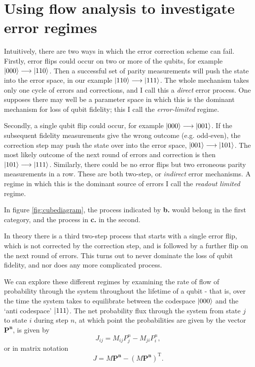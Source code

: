 \documentclass{report}
\begin{document}
\section{Using flow analysis to investigate error regimes}
Intuitively, there are two ways in which the error correction scheme can fail. Firstly, error flips could occur on two or more of the qubits, for example $\ket{000} \longrightarrow \ket{110}$. Then a successful set of parity measurements will push the state into the error space, in our example $\ket{110} \longrightarrow \ket{111}$. The whole mechanism takes only one cycle of errors and corrections, and I call this a \textit{direct} error process. One supposes there may well be a parameter space in which this is the dominant mechanism for loss of qubit fidelity; this I call the \textit{error-limited} regime.

Secondly, a single qubit flip could occur, for example $\ket{000} \longrightarrow \ket{001}$. If the subsequent fidelity measurements give the wrong outcome (e.g. odd-even), the correction step may push the state over into the error space, $\ket{001} \longrightarrow \ket{101}$. The most likely outcome of the next round of errors and correction is then $\ket{101} \longrightarrow \ket{111}$. Similarly, there could be no error flips but two erroneous parity measurements in a row. These are both two-step, or \textit{indirect} error mechanisms. A regime in which this is the dominant source of errors I call the \textit{readout limited} regime.

In figure \ref{fig:cubediagram}, the process indicated by \textbf{b.} would belong in the first category, and the process in \textbf{c.} in the second.

In theory there is a third two-step process that starts with a single error flip, which is not corrected by the correction step, and is followed by a further flip on the next round of errors. This turns out to never dominate the loss of qubit fidelity, and nor does any more complicated process.

We can explore these different regimes by examining the rate of flow of probability through the system throughout the lifetime of a qubit - that is, over the time the system takes to equilibrate between the codespace $\ket{000}$ and the `anti codespace' $\ket{111}$. The net probability flux through the system from state $j$ to state $i$ during step $n$, at which point the probabilities are given by the vector $\mathbf{P^n}$, is given by
\begin{equation*}
    J_{ij} = M_{ij}P^n_j - M_{ji} P^n_i,
\end{equation*}
or in matrix notation
\begin{equation*}
    J = M\mathbf{P^n} - (M \mathbf{P^n})^\mathrm{T}.
\end{equation*}
\end{document}
